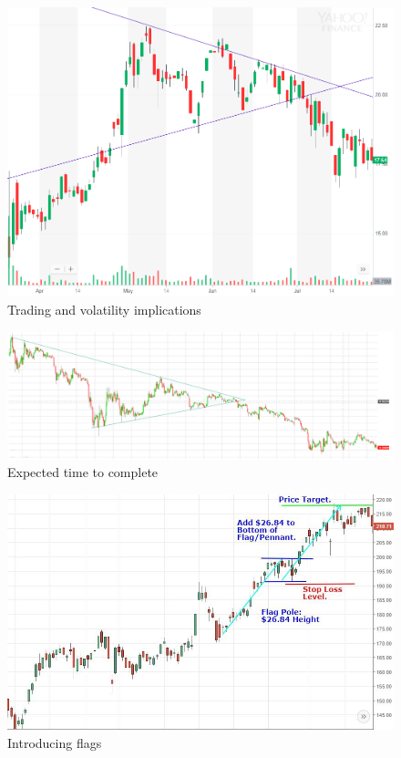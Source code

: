 \documentclass{article}
\begin{document}
\vspace{10pt}

\begin{figure}[!htb]
    \centering
    \includegraphics[width=500pt]{imgs/51.png}
    \caption{Trading and volatility implications}
\end{figure}

\vspace{10pt}

\begin{figure}[!htb]
    \centering
    \includegraphics[width=\textwidth]{imgs/52.png}
    \caption{Expected time to complete}
\end{figure}

\clearpage
\vspace*{.5in}

\begin{figure}[!htb]
    \centering
    \includegraphics[width=\textwidth]{imgs/53.png}
    \caption{Introducing flags}
\end{figure}
\end{document}
